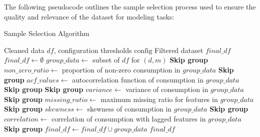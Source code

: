 \documentclass[journal]{IEEEtran}
\begin{document}
The following pseudocode outlines the sample selection process used to ensure the quality and relevance of the dataset for modeling tasks:

\begin{algorithm}[H]
\caption{Sample Selection Algorithm}
\begin{algorithmic}[1]
\Require Cleaned data $df$, configuration thresholds $\text{config}$
\Ensure Filtered dataset $final\_df$
\State $final\_df \gets \emptyset$
    \State $group\_data \gets$ subset of $df$ for $(d, m)$
        \State \textbf{Skip group} 
    \EndIf
    \State $non\_zero\_ratio \gets$ proportion of non-zero consumption in $group\_data$
        \State \textbf{Skip group} 
    \EndIf
    \State $acf\_values \gets$ autocorrelation function of consumption in $group\_data$
        \State \textbf{Skip group} 
    \EndIf
        \State \textbf{Skip group} 
    \EndIf
    \State $variance \gets$ variance of consumption in $group\_data$
        \State \textbf{Skip group} 
    \EndIf
    \State $missing\_ratio \gets$ maximum missing ratio for features in $group\_data$
        \State \textbf{Skip group} 
    \EndIf
    \State $skewness \gets$ skewness of consumption in $group\_data$
        \State \textbf{Skip group} 
    \EndIf
    \State $correlation \gets$ correlation of consumption with lagged features in $group\_data$
        \State \textbf{Skip group} 
    \EndIf
    \State $final\_df \gets final\_df \cup group\_data$
\EndFor
\State \Return $final\_df$
\end{algorithmic}
\end{algorithm}



\end{document}
